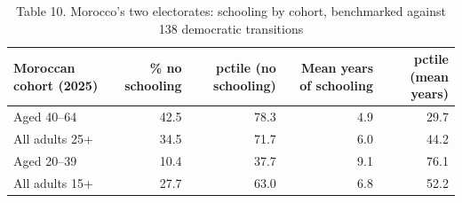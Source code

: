 \begin{table}
\caption{Table 10. Morocco's two electorates: schooling by cohort, benchmarked against 138 democratic transitions}
\label{tab:T10_cohorts}
\begin{tabular}{lrrrr}
\toprule
Moroccan cohort (2025) & \% no schooling & pctile (no schooling) & Mean years of schooling & pctile (mean years) \\
\midrule
Aged 40–64 & 42.5 & 78.3 & 4.9 & 29.7 \\
All adults 25+ & 34.5 & 71.7 & 6.0 & 44.2 \\
Aged 20–39 & 10.4 & 37.7 & 9.1 & 76.1 \\
All adults 15+ & 27.7 & 63.0 & 6.8 & 52.2 \\
\bottomrule
\end{tabular}
\end{table}
